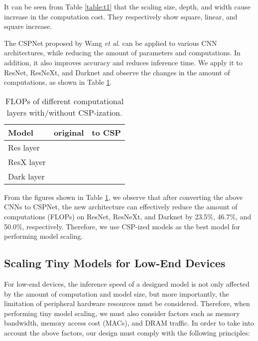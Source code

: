 \documentclass[10pt,twocolumn,letterpaper]{article}
\begin{document}
It can be seen from Table \ref{table:t1} that the scaling size, depth, and width cause increase in the computation cost.  They respectively show square, linear, and square increase.

The CSPNet \cite{wang2020cspnet} proposed by Wang \textit{et al.} can be applied to various CNN architectures, while reducing the amount of parameters and computations. In addition, it also improves accuracy and reduces inference time.  We apply it to ResNet, ResNeXt, and Darknet and observe the changes in the amount of computations, as shown in Table \ref{table:t3}.

\begin{table}[h]
	\centering
	\begin{threeparttable}[h]
		\footnotesize
		\caption{FLOPs of different computational layers with/without CSP-ization.}
		\label{table:t3}
		\setlength\tabcolsep{3.5pt}
		\begin{tabular}{lcc}
			\toprule
			\textbf{Model} & \textbf{original} & \textbf{to CSP} \\				
			\midrule
			Res layer &  &  \\
			ResX layer &  &  \\
			Dark layer &  &  \\
			\bottomrule
		\end{tabular}
	\end{threeparttable}
\end{table}

From the figures shown in Table \ref{table:t3}, we observe that after converting the above CNNs to CSPNet, the new architecture can effectively reduce the amount of computations (FLOPs) on ResNet, ResNeXt, and Darknet by 23.5\%, 46.7\%, and 50.0\%, respectively.  Therefore, we use CSP-ized models as the best model for performing model scaling.

\subsection{Scaling Tiny Models for Low-End Devices}
\label{ss:tp}

For low-end devices, the inference speed of a designed model is not only affected by the amount of computation and model size, but more importantly, the limitation of peripheral hardware resources must be considered.  Therefore, when performing tiny model scaling, we must also consider factors such as memory bandwidth, memory access cost (MACs), and DRAM traffic.  In order to take into account the above factors, our design must comply with the following principles:
\end{document}
